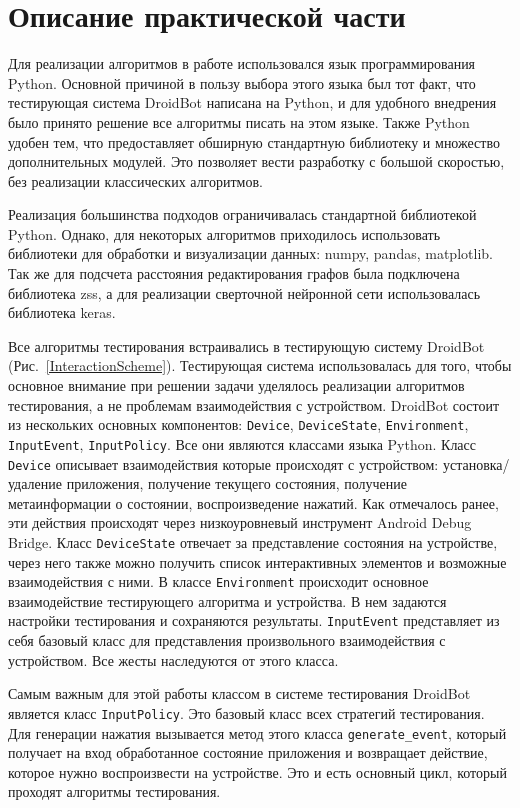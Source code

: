 \section{Описание практической части}
\label{sec:Chapter4} 

Для реализации алгоритмов в работе использовался язык программирования Python. Основной причиной в пользу выбора этого языка был тот факт, что тестирующая система DroidBot написана на Python, и для удобного внедрения было принято решение все алгоритмы писать на этом языке. Также Python удобен тем, что предоставляет обширную стандартную библиотеку и множество дополнительных модулей. Это позволяет вести разработку с большой скоростью, без реализации классических алгоритмов.

Реализация большинства подходов ограничивалась стандартной библиотекой  Python. Однако, для некоторых алгоритмов приходилось использовать библиотеки для обработки и визуализации данных: numpy, pandas, matplotlib. Так же для подсчета расстояния редактирования графов была подключена библиотека zss, а для реализации сверточной нейронной сети использовалась библиотека keras.

Все алгоритмы тестирования встраивались в тестирующую систему DroidBot~\cite{li2017droidbot} (Рис.~\ref{InteractionScheme}). Тестирующая система использовалась для того, чтобы основное внимание при решении задачи уделялось реализации алгоритмов тестирования, а не проблемам взаимодействия с устройством. DroidBot состоит из нескольких основных компонентов: \texttt{Device}, \texttt{DeviceState}, \texttt{Environment}, \texttt{InputEvent}, \texttt{InputPolicy}. Все они являются классами языка Python. Класс \texttt{Device} описывает взаимодействия которые происходят с устройством: установка/удаление приложения, получение текущего состояния, получение метаинформации о состоянии, воспроизведение нажатий. Как отмечалось ранее, эти действия происходят через низкоуровневый инструмент Android Debug Bridge. Класс \texttt{DeviceState} отвечает за представление состояния на устройстве, через него также можно получить список интерактивных элементов и возможные взаимодействия с ними. В классе \texttt{Environment} происходит основное взаимодействие тестирующего алгоритма и устройства. В нем задаются настройки тестирования и сохраняются результаты. \texttt{InputEvent} представляет из себя базовый класс для представления произвольного взаимодействия с устройством. Все жесты наследуются от этого класса.

Самым важным для этой работы классом в системе тестирования DroidBot является класс \texttt{InputPolicy}. Это базовый класс всех стратегий тестирования. Для генерации нажатия вызывается метод этого класса \texttt{generate\_event}, который получает на вход обработанное состояние приложения и возвращает действие, которое нужно воспроизвести на устройстве. Это и есть основный цикл, который проходят алгоритмы тестирования.

